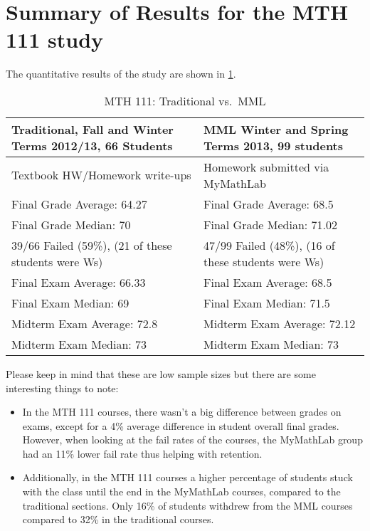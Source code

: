 \section{Summary of Results for the MTH 111 study}
The quantitative results of the study are shown in \cref{app:tab:onlinehwstudy111}.
\begin{longtable}{p{}p{}}
	\caption{MTH 111: Traditional vs.\ MML}\label{app:tab:onlinehwstudy111}\\
	\toprule
	Traditional, Fall and Winter Terms 2012/13, 66 Students & MML Winter and Spring Terms 2013, 99 students       \\
	\midrule
	Textbook HW/Homework write-ups                          & Homework submitted via MyMathLab                    \\
	Final Grade Average:  64.27                             & Final Grade Average:  68.5                          \\
	Final Grade Median:  70                                 & Final Grade Median:  71.02                          \\
	39/66 Failed (59\%), (21 of these students were Ws)     & 47/99 Failed (48\%), (16 of these students were Ws) \\
	Final Exam Average:  66.33                              & Final Exam Average:  68.5                           \\
	Final Exam Median:  69                                  & Final Exam Median:  71.5                            \\
	Midterm Exam Average:  72.8                             & Midterm Exam Average:  72.12                        \\
	Midterm Exam Median:  73                                & Midterm Exam Median:  73                            \\
	\bottomrule
\end{longtable}
Please keep in mind that these are low sample sizes but there are some
interesting things to note: 
\begin{itemize}
	\item In the MTH 111 courses, there wasn't a big difference between grades on
	exams, except for a 4\% average difference in student overall final grades.
	However, when looking at the fail rates of the courses, the MyMathLab group
	had an 11\% lower fail rate thus helping with retention.
	\item Additionally, in the MTH 111 courses a higher percentage of students
	stuck with the class until the end in the MyMathLab courses, compared to
	the traditional sections.  Only 16\% of students withdrew from the MML
	courses compared to 32\% in the traditional courses.  
\end{itemize}

